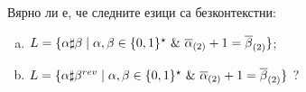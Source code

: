 \begin{problem}
  Вярно ли е, че следните езици са безконтекстни:
  \begin{enumerate}[a)]
  \item 
    $L = \{\alpha\sharp\beta \mid \alpha,\beta \in \{0,1\}^\star\ \&\ \overline{\alpha}_{(2)} + 1 = \overline{\beta}_{(2)} \}$;
  \item
    $L = \{\alpha\sharp\beta^{rev} \mid \alpha,\beta \in \{0,1\}^\star\ \&\ \overline{\alpha}_{(2)} + 1 = \overline{\beta}_{(2)} \}$ ?
  \end{enumerate}
\end{problem}
